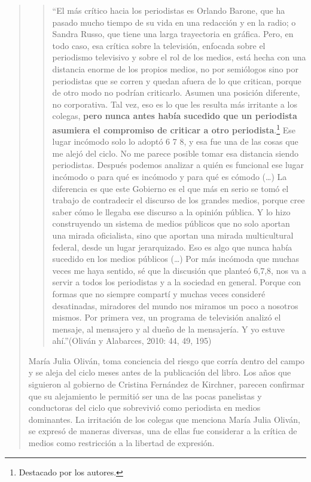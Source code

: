 \begin{quote}
\begin{quote}
	\enquote{El más crítico hacia los periodistas es Orlando Barone, que ha pasado mucho tiempo de su vida en una redacción y en la radio; o Sandra Russo, que tiene una larga trayectoria en gráfica. Pero, en todo caso, esa crítica sobre la televisión, enfocada sobre el periodismo televisivo y sobre el rol de los medios, está hecha con una distancia enorme de los propios medios, no por semiólogos sino por periodistas que se corren y quedan afuera de lo que critican, porque de otro modo no podrían criticarlo. Asumen una posición diferente, no corporativa. Tal vez, eso es lo que les resulta más irritante a los colegas, \textbf{pero nunca antes había sucedido que un periodista asumiera el compromiso de criticar a otro periodista}.\footnote{Destacado por los autores.} Ese lugar incómodo solo lo adoptó 6 7 8, y esa fue una de las cosas que me alejó del ciclo. No me parece posible tomar esa distancia siendo periodistas. Después podemos analizar a quién es funcional ese lugar incómodo o para qué es incómodo y para qué es cómodo (\dots) La diferencia es que este Gobierno es el que más en serio se tomó el trabajo de contradecir el discurso de los grandes medios, porque cree saber cómo le llegaba ese discurso a la opinión pública. Y lo hizo construyendo un sistema de medios públicos que no solo aportan una mirada oficialista, sino que aportan una mirada multicultural federal, desde un lugar jerarquizado. Eso es algo que nunca había sucedido en los medios públicos (\dots) Por más incómoda que muchas veces me haya sentido, sé que la discusión que planteó 6,7,8, nos va a servir a todos los periodistas y a la sociedad en general. Porque con formas que no siempre compartí y muchas veces consideré desatinadas, miradores del mundo nos miramos un poco a nosotros mismos. Por primera vez, un programa de televisión analizó el mensaje, al mensajero y al dueño de la mensajería. Y yo estuve ahí.}(Oliván y Alabarces, 2010: 44, 49, 195)
\end{quote}


María Julia Oliván, toma conciencia del riesgo que corría dentro del campo y se aleja del ciclo meses antes de la publicación del libro. Los años que siguieron al gobierno de Cristina Fernández de Kirchner, parecen confirmar que su alejamiento le permitió ser una de las pocas panelistas y conductoras del ciclo que sobrevivió como periodista en medios dominantes. La irritación de los colegas que menciona María Julia Oliván, se expresó de maneras diversas, una de ellas fue considerar a la crítica de medios como restricción a la libertad de expresión.


\end{quote}
